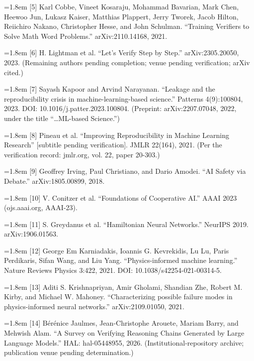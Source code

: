 \documentclass[11pt]{article}
\begin{document}
\noindent\hangindent=1.8em [5] Karl Cobbe, Vineet Kosaraju, Mohammad Bavarian, Mark Chen, Heewoo Jun, Lukasz Kaiser, Matthias Plappert, Jerry Tworek, Jacob Hilton, Reiichiro Nakano, Christopher Hesse, and John Schulman. ``Training Verifiers to Solve Math Word Problems.'' arXiv:2110.14168, 2021.\par\medskip
\noindent\hangindent=1.8em [6] H. Lightman et al. ``Let's Verify Step by Step.'' arXiv:2305.20050, 2023. (Remaining authors pending completion; venue pending verification; arXiv cited.)\par\medskip
\noindent\hangindent=1.8em [7] Sayash Kapoor and Arvind Narayanan. ``Leakage and the reproducibility crisis in machine-learning-based science.'' Patterns 4(9):100804, 2023. DOI: 10.1016/j.patter.2023.100804. (Preprint: arXiv:2207.07048, 2022, under the title ``…ML-based Science.'')\par\medskip
\noindent\hangindent=1.8em [8] Pineau et al. ``Improving Reproducibility in Machine Learning Research'' [subtitle pending verification]. JMLR 22(164), 2021. (Per the verification record: jmlr.org, vol. 22, paper 20-303.)\par\medskip
\noindent\hangindent=1.8em [9] Geoffrey Irving, Paul Christiano, and Dario Amodei. ``AI Safety via Debate.'' arXiv:1805.00899, 2018.\par\medskip
\noindent\hangindent=1.8em [10] V. Conitzer et al. ``Foundations of Cooperative AI.'' AAAI 2023 (ojs.aaai.org, AAAI-23).\par\medskip
\noindent\hangindent=1.8em [11] S. Greydanus et al. ``Hamiltonian Neural Networks.'' NeurIPS 2019. arXiv:1906.01563.\par\medskip
\noindent\hangindent=1.8em [12] George Em Karniadakis, Ioannis G. Kevrekidis, Lu Lu, Paris Perdikaris, Sifan Wang, and Liu Yang. ``Physics-informed machine learning.'' Nature Reviews Physics 3:422, 2021. DOI: 10.1038/s42254-021-00314-5.\par\medskip
\noindent\hangindent=1.8em [13] Aditi S. Krishnapriyan, Amir Gholami, Shandian Zhe, Robert M. Kirby, and Michael W. Mahoney. ``Characterizing possible failure modes in physics-informed neural networks.'' arXiv:2109.01050, 2021.\par\medskip
\noindent\hangindent=1.8em [14] Bérénice Jaulmes, Jean-Christophe Arouete, Mariam Barry, and Mehwish Alam. ``A Survey on Verifying Reasoning Chains Generated by Large Language Models.'' HAL: hal-05448955, 2026. (Institutional-repository archive; publication venue pending determination.)\par\medskip
\end{document}
